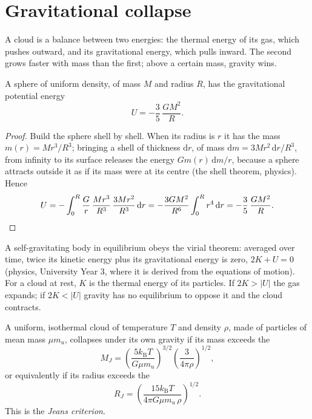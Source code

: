 \section{Gravitational collapse}

A cloud is a balance between two energies: the thermal energy of its gas,
which pushes outward, and its gravitational energy, which pulls inward. The
second grows faster with mass than the first; above a certain mass, gravity
wins.

\begin{proposition}
\label{prop:b2:ism-star-formation:grav-energy}
A sphere of uniform density, of mass $M$ and radius $R$, has the
gravitational potential energy
\[
  U = -\frac{3}{5}\,\frac{G M^2}{R}.
\]
\end{proposition}

\begin{proof}
Build the sphere shell by shell. When its radius is $r$ it has the mass
$m(r) = M r^3/R^3$; bringing a shell of thickness $\mathrm dr$, of mass
$\mathrm dm = 3M r^2\,\mathrm dr/R^3$, from infinity to its surface releases
the energy $G m(r)\,\mathrm dm/r$, because a sphere attracts outside it as if
its mass were at its centre (the shell theorem, physics). Hence
\[
  U = -\int_0^R \frac{G}{r}\,\frac{M r^3}{R^3}\,\frac{3 M r^2}{R^3}\,\mathrm dr
    = -\frac{3 G M^2}{R^6}\int_0^R r^4\,\mathrm dr = -\frac{3}{5}\,\frac{G M^2}{R}.
  \qedhere
\]
\end{proof}

A self-gravitating body in equilibrium obeys the virial theorem: averaged
over time, twice its kinetic energy plus its gravitational energy is zero,
$2K + U = 0$ (physics, University Year 3, where it is derived from the
equations of motion). For a cloud at rest, $K$ is the thermal energy of its
particles. If $2K > |U|$ the gas expands; if $2K < |U|$ gravity has no
equilibrium to oppose it and the cloud contracts.

\begin{proposition}\label{prop:b2:ism-star-formation:jeans}
A uniform, isothermal cloud of temperature $T$ and density $\rho$, made of
particles of mean mass $\mu m_u$, collapses under its own gravity if its mass
exceeds the \emph{}
\[
  M_J = \left(\frac{5 k_{\mathrm B} T}{G\mu m_u}\right)^{3/2}
        \left(\frac{3}{4\pi\rho}\right)^{1/2},
\]
or equivalently if its radius exceeds the \emph{}
\[
  R_J = \left(\frac{15 k_{\mathrm B} T}{4\pi G\mu m_u\,\rho}\right)^{1/2}.
\]
This is the \emph{Jeans criterion}.
\end{proposition}

